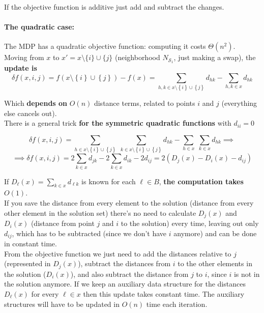 \documentclass[11pt]{article}
\begin{document}
	If the objective function is additive just add and subtract the changes.\\
	
	\newpage
	
	\paragraph{The quadratic case:} The MDP has a quadratic objective function: computing it costs $\Theta (n^2)$.\\
	
	Moving from $x$ to $x' = x \setminus \{i\} \cup \{j\}$ (neighborhood $N_{\mathcal{S}_1}$, just making a swap), the \textbf{update is}
	$$ \delta f (x,i,j) = f \left(x \setminus \left\{i\right\} \cup \left\{j\right\}\right) - f(x) = \sum_{h,k \in x \setminus \left\{i\right\} \cup \left\{j\right\}} d_{hk} - \sum_{h,k \in x} d_{hk} $$
	
	Which \textbf{depends on} $O (n)$ distance terms, related to points $i$ and $j$ (everything else cancels out).\\
	
	There is a general trick \textbf{for the symmetric quadratic functions} with $d_{ii} = 0$

	$$ \delta f (x,i,j) = \sum_{h \in x \setminus \left\{i\right\} \cup \left\{j\right\}} \; \sum_{k \in x \setminus \left\{i\right\} \cup \left\{j\right\}} d_{hk} - \sum_{h \in x} \; \sum_{k \in x} d_{hk} \implies $$
	$$ \implies \delta f (x,i,j) = 2 \sum_{k \in x} d_{jk} - 2 \sum_{k \in x} d_{ik} - 2 d_{ij} = 2 \left(D_j (x) - D_i (x) - d_{ij}\right) $$

	If $D_{\ell} (x) = \sum_{k \in x} d_{\ell k}$ is known for each $\ell \in B$, \textbf{the computation takes} $O (1)$.\\
	
	If you save the distance from every element to the solution (distance from every other element in the solution set) there's no need to calculate $D_j (x)$ and $D_i (x)$ (distance from point $j$ and $i$ to the solution) every time, leaving out only $d_{ij}$, which has to be subtracted (since we don't have $i$ anymore) and can be done in constant time.\\
	
	From the objective function we just need to add the distances relative to $j$ (represented in $D_j (x)$), subtract the distances from $i$ to the other elements in the solution ($D_i (x)$), and also subtract the distance from $j$ to $i$, since $i$ is not in the solution anymore. If we keep an auxiliary data structure for the distances $D_{\ell} (x)$ for every $\ell \in x$ then this update takes constant time. The auxiliary structures will have to be updated in $O (n)$ time each iteration. \\
	
\end{document}
